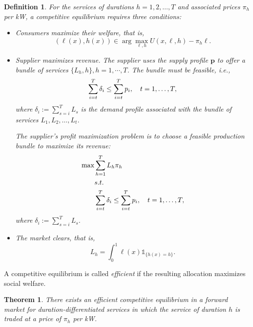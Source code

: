 \documentclass[10pt,draftcls,onecolumn]{IEEEtran}
\newtheorem{theorem}{Theorem}
\newtheorem{definition}{Definition}
\let \VEC \mathbf
\def\ind{{\mathds{1}}}
\newcounter{l1}
\newcounter{l2}
\newcounter{l3}
\begin{document}
\begin{definition}
For the services  of durations $h=1,2,\ldots,T$ and associated prices $\pi_h$ per kW,  a competitive equilibrium requires three conditions:

\begin{itemize}
\item Consumers maximize their welfare, that is,
\begin{equation}
(\ell (x), h(x)) \in \arg
\max_{\ell,h} U(x,\ell,h) - \pi_h \ell .
\end{equation}

\item Supplier maximizes  revenue.  
The supplier uses the supply profile $\VEC p$ to offer a bundle of services $\{L_h, h\}, h=1, \cdots, T$.  The bundle must be feasible, i.e., 
\begin{align}
\sum_{i=t}^T \delta_i \leq \sum_{i=t}^T p_i, \quad t=1,\ldots,T \notag,
\end{align}
where $\delta_i :=  \sum_{s=i}^T L_s $ is the demand profile associated with the bundle of services $L_1,L_2,\ldots,L_t$.

 The supplier's profit maximization problem is to choose a feasible production bundle to maximize its revenue:
\begin{equation}
\begin{aligned}
\max& \sum_{h=1}^T L_h \pi_h\\
&s.t.\;\;\; \\
&\sum_{i=t}^T \delta_i \leq \sum_{i=t}^T p_i, \quad t=1,\ldots,T \notag,
\end{aligned}
\end{equation}
where $\delta_i :=  \sum_{s=i}^T L_s $.
\item The market clears, that is,
\begin{equation}
L_h = \int_0^1 \ell(x) \ind_{\{h(x)=h\}}.
\end{equation}
    \end{itemize}
\end{definition}
A competitive equilibrium is called \textit{efficient} if the resulting allocation maximizes social welfare.
\begin{theorem}
There exists an efficient competitive equilibrium in a forward market for duration-differentiated services in which the service of duration $h$ is traded at a  price of $\pi_h$ per kW. 
\label{thm:market}
\end{theorem}
\end{document}
